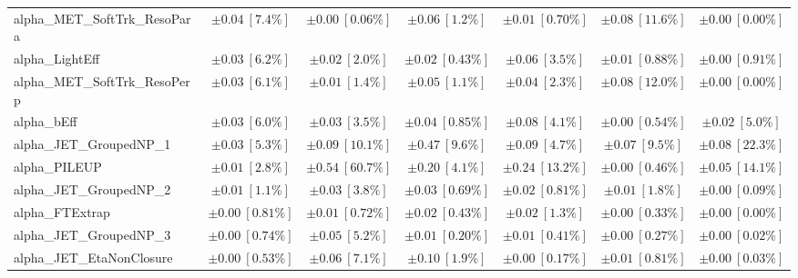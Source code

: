 \begin{sidewaystable}
\begin{center}
\begin{tabular*}{\textwidth}{@{\extracolsep{\fill}}lcccccc}
alpha\_MET\_SoftTrk\_ResoPara         & $\pm 0.04\ [7.4\%] $          & $\pm 0.00\ [0.06\%] $          & $\pm 0.06\ [1.2\%] $          & $\pm 0.01\ [0.70\%] $          & $\pm 0.08\ [11.6\%] $          & $\pm 0.00\ [0.00\%] $       \\
alpha\_LightEff         & $\pm 0.03\ [6.2\%] $          & $\pm 0.02\ [2.0\%] $          & $\pm 0.02\ [0.43\%] $          & $\pm 0.06\ [3.5\%] $          & $\pm 0.01\ [0.88\%] $          & $\pm 0.00\ [0.91\%] $       \\
alpha\_MET\_SoftTrk\_ResoPerp         & $\pm 0.03\ [6.1\%] $          & $\pm 0.01\ [1.4\%] $          & $\pm 0.05\ [1.1\%] $          & $\pm 0.04\ [2.3\%] $          & $\pm 0.08\ [12.0\%] $          & $\pm 0.00\ [0.00\%] $       \\
alpha\_bEff         & $\pm 0.03\ [6.0\%] $          & $\pm 0.03\ [3.5\%] $          & $\pm 0.04\ [0.85\%] $          & $\pm 0.08\ [4.1\%] $          & $\pm 0.00\ [0.54\%] $          & $\pm 0.02\ [5.0\%] $       \\
alpha\_JET\_GroupedNP\_1         & $\pm 0.03\ [5.3\%] $          & $\pm 0.09\ [10.1\%] $          & $\pm 0.47\ [9.6\%] $          & $\pm 0.09\ [4.7\%] $          & $\pm 0.07\ [9.5\%] $          & $\pm 0.08\ [22.3\%] $       \\
alpha\_PILEUP         & $\pm 0.01\ [2.8\%] $          & $\pm 0.54\ [60.7\%] $          & $\pm 0.20\ [4.1\%] $          & $\pm 0.24\ [13.2\%] $          & $\pm 0.00\ [0.46\%] $          & $\pm 0.05\ [14.1\%] $       \\
alpha\_JET\_GroupedNP\_2         & $\pm 0.01\ [1.1\%] $          & $\pm 0.03\ [3.8\%] $          & $\pm 0.03\ [0.69\%] $          & $\pm 0.02\ [0.81\%] $          & $\pm 0.01\ [1.8\%] $          & $\pm 0.00\ [0.09\%] $       \\
alpha\_FTExtrap         & $\pm 0.00\ [0.81\%] $          & $\pm 0.01\ [0.72\%] $          & $\pm 0.02\ [0.43\%] $          & $\pm 0.02\ [1.3\%] $          & $\pm 0.00\ [0.33\%] $          & $\pm 0.00\ [0.00\%] $       \\
alpha\_JET\_GroupedNP\_3         & $\pm 0.00\ [0.74\%] $          & $\pm 0.05\ [5.2\%] $          & $\pm 0.01\ [0.20\%] $          & $\pm 0.01\ [0.41\%] $          & $\pm 0.00\ [0.27\%] $          & $\pm 0.00\ [0.02\%] $       \\
alpha\_JET\_EtaNonClosure         & $\pm 0.00\ [0.53\%] $          & $\pm 0.06\ [7.1\%] $          & $\pm 0.10\ [1.9\%] $          & $\pm 0.00\ [0.17\%] $          & $\pm 0.01\ [0.81\%] $          & $\pm 0.00\ [0.03\%] $       \\

\end{tabular*}
\end{center}
\end{sidewaystable}
